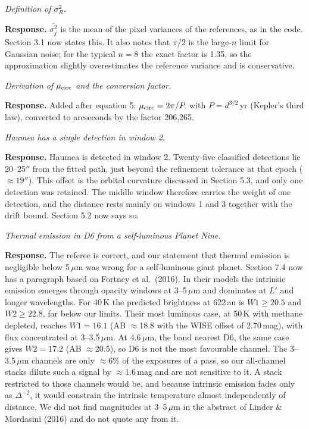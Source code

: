 \documentclass[11pt]{article}
\newenvironment{referee}{\par\color{black!60}\itshape}{\par}
\newcommand{\resp}{\par\noindent\textbf{Response.} }
\begin{document}
\begin{referee}
Definition of $\sigma_R^2$.
\end{referee}
\resp $\overline{\sigma_j^2}$ is the mean of the pixel variances of the references, as in the code. Section 3.1 now states this. It also notes that $\pi/2$ is the large-$n$ limit for Gaussian noise; for the typical $n = 8$ the exact factor is 1.35, so the approximation slightly overestimates the reference variance and is conservative.

\begin{referee}
Derivation of $\mu_{\rm circ}$ and the conversion factor.
\end{referee}
\resp Added after equation 5: $\mu_{\rm circ} = 2\pi/P$ with $P = d^{3/2}$\,yr (Kepler's third law), converted to arcseconds by the factor 206{,}265.

\begin{referee}
Haumea has a single detection in window 2.
\end{referee}
\resp Haumea is detected in window 2. Twenty-five classified detections lie 20--25$''$ from the fitted path, just beyond the refinement tolerance at that epoch ($\approx 19''$). This offset is the orbital curvature discussed in Section 5.3, and only one detection was retained. The middle window therefore carries the weight of one detection, and the distance rests mainly on windows 1 and 3 together with the drift bound. Section 5.2 now says so.

\begin{referee}
Thermal emission in D6 from a self-luminous Planet Nine.
\end{referee}
\resp The referee is correct, and our statement that thermal emission is negligible below 5\,$\mu$m was wrong for a self-luminous giant planet. Section 7.4 now has a paragraph based on Fortney et al.\ (2016). In their models the intrinsic emission emerges through opacity windows at 3--5\,$\mu$m and dominates at $L'$ and longer wavelengths. For 40\,K the predicted brightness at 622\,au is $W1 \ge 20.5$ and $W2 \ge 22.8$, far below our limits. Their most luminous case, at 50\,K with methane depleted, reaches $W1 = 16.1$ (AB $\approx$18.8 with the WISE offset of 2.70\,mag), with flux concentrated at 3--3.5\,$\mu$m. At 4.6\,$\mu$m, the band nearest D6, the same case gives $W2 = 17.2$ (AB $\approx$20.5), so D6 is not the most favourable channel. The 3--3.5\,$\mu$m channels are only $\approx$6\% of the exposures of a pass, so our all-channel stacks dilute such a signal by $\approx$1.6\,mag and are not sensitive to it. A stack restricted to those channels would be, and because intrinsic emission fades only as $\Delta^{-2}$, it would constrain the intrinsic temperature almost independently of distance. We did not find magnitudes at 3--5\,$\mu$m in the abstract of Linder \& Mordasini (2016) and do not quote any from it.
\end{document}
